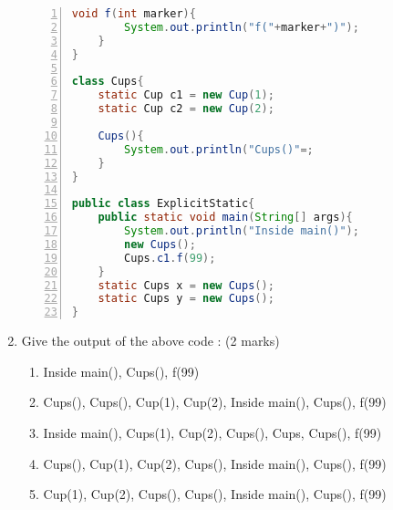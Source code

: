 \documentclass{article}
\begin{document}
\begin{enumerate}[label=\arabic* --,resume]
\begin{lstlisting}[language=Java, numbers=left]
	void f(int marker){
		System.out.println("f("+marker+")");
	}
}

class Cups{
	static Cup c1 = new Cup(1);
	static Cup c2 = new Cup(2);
	
	Cups(){
		System.out.println("Cups()"=;
	}
}

public class ExplicitStatic{
	public static void main(String[] args){
		System.out.println("Inside main()");
		new Cups();
		Cups.c1.f(99);
	}
	static Cups x = new Cups();
	static Cups y = new Cups();
}

	\end{lstlisting}
	\item Give the output of the above code : (2 marks)
	\begin{enumerate}
		\item Inside main(), Cups(), f(99)
		\item Cups(), Cups(), Cup(1), Cup(2), Inside main(), Cups(), f(99)
		\item Inside main(), Cups(1), Cup(2), Cups(), Cups, Cups(), f(99)
		\item Cups(), Cup(1), Cup(2), Cups(), Inside main(), Cups(), f(99)
		\item Cup(1), Cup(2), Cups(), Cups(), Inside main(), Cups(), f(99)
	\end{enumerate}
\end{enumerate}
\end{document}
